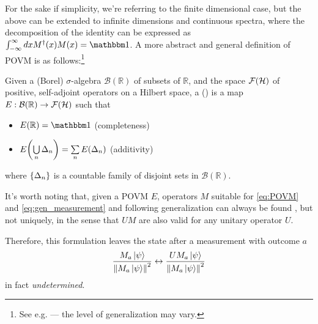 For the sake if simplicity, we're referring to the finite dimensional case,
but the above can be extended to infinite dimensions and continuous spectra,
where the decomposition of the identity can be expressed as
$\int_{-\infty}^{\infty} dx M^{\dagger}(x)M(x) = \idop $.
A more abstract and general definition of POVM is as
follows:\footnote{
  See e.g. \cite{BeneduciPhD, Berberian} --- the level of generalization may vary.
}
\begin{definition}
  Given a (Borel) $\sigma$-algebra $\mathcal{B}(\mathbb{R})$ of subsets of $\mathbb{R}$,
  and the space $\mathcal{F}(\mathcal{H})$ of positive, self-adjoint operators on a Hilbert space,
  a  ()
  is a map $E: \mathcal{B}(\mathbb{R}) \rightarrow \mathcal{F}(\mathcal{H})$
  such that
  \begin{itemize}
    \item $E(\mathbb{R}) = \idop$ (completeness)
    \item $E\qty(\bigcup\limits_{n} \Delta_n) = \sum\limits_{n} E\qty(\Delta_n)$ (additivity) 
  \end{itemize}
  where $\left\{\Delta_n\right\}$ is a countable family of disjoint sets in
  $\mathcal{B}(\mathbb{R})$.
\end{definition}

\citereset
It's worth noting that,
given a POVM $E$, operators $M$
suitable for \eqref{eq:POVM} and \eqref{eq:gen_measurement}
and following generalization
can always be found \parencite[sec.3.1]{PreskillNotes},
but not uniquely, in the sense that
$UM$ are also valid
for any unitary operator $U$.

Therefore, this formulation leaves the state after a measurement
with outcome $a$
\[
  \frac{M_a\ket{\psi}}{\norm{M_a\ket{\psi}}^2}
  \leftrightarrow
  \frac{UM_a\ket{\psi}}{\norm{M_a\ket{\psi}}^2}
\]
in fact \emph{undetermined}.
